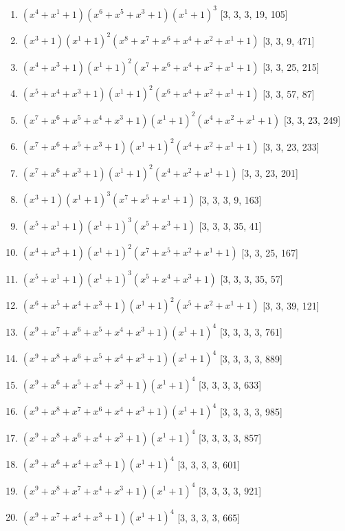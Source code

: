 \documentclass[10pt,twocolumn]{article}
\begin{document}
\begin{enumerate}
\item $(x^{4} + x^{1} + 1)(x^{6} + x^{5} + x^{3} + 1)(x^{1} + 1)^{3}$  [3, 3, 3, 19, 105]
\item $(x^{3} + 1)(x^{1} + 1)^{2}(x^{8} + x^{7} + x^{6} + x^{4} + x^{2} + x^{1} + 1)$  [3, 3, 9, 471]
\item $(x^{4} + x^{3} + 1)(x^{1} + 1)^{2}(x^{7} + x^{6} + x^{4} + x^{2} + x^{1} + 1)$  [3, 3, 25, 215]
\item $(x^{5} + x^{4} + x^{3} + 1)(x^{1} + 1)^{2}(x^{6} + x^{4} + x^{2} + x^{1} + 1)$  [3, 3, 57, 87]
\item $(x^{7} + x^{6} + x^{5} + x^{4} + x^{3} + 1)(x^{1} + 1)^{2}(x^{4} + x^{2} + x^{1} + 1)$  [3, 3, 23, 249]
\item $(x^{7} + x^{6} + x^{5} + x^{3} + 1)(x^{1} + 1)^{2}(x^{4} + x^{2} + x^{1} + 1)$  [3, 3, 23, 233]
\item $(x^{7} + x^{6} + x^{3} + 1)(x^{1} + 1)^{2}(x^{4} + x^{2} + x^{1} + 1)$  [3, 3, 23, 201]
\item $(x^{3} + 1)(x^{1} + 1)^{3}(x^{7} + x^{5} + x^{1} + 1)$  [3, 3, 3, 9, 163]
\item $(x^{5} + x^{1} + 1)(x^{1} + 1)^{3}(x^{5} + x^{3} + 1)$  [3, 3, 3, 35, 41]
\item $(x^{4} + x^{3} + 1)(x^{1} + 1)^{2}(x^{7} + x^{5} + x^{2} + x^{1} + 1)$  [3, 3, 25, 167]
\item $(x^{5} + x^{1} + 1)(x^{1} + 1)^{3}(x^{5} + x^{4} + x^{3} + 1)$  [3, 3, 3, 35, 57]
\item $(x^{6} + x^{5} + x^{4} + x^{3} + 1)(x^{1} + 1)^{2}(x^{5} + x^{2} + x^{1} + 1)$  [3, 3, 39, 121]
\item $(x^{9} + x^{7} + x^{6} + x^{5} + x^{4} + x^{3} + 1)(x^{1} + 1)^{4}$  [3, 3, 3, 3, 761]
\item $(x^{9} + x^{8} + x^{6} + x^{5} + x^{4} + x^{3} + 1)(x^{1} + 1)^{4}$  [3, 3, 3, 3, 889]
\item $(x^{9} + x^{6} + x^{5} + x^{4} + x^{3} + 1)(x^{1} + 1)^{4}$  [3, 3, 3, 3, 633]
\item $(x^{9} + x^{8} + x^{7} + x^{6} + x^{4} + x^{3} + 1)(x^{1} + 1)^{4}$  [3, 3, 3, 3, 985]
\item $(x^{9} + x^{8} + x^{6} + x^{4} + x^{3} + 1)(x^{1} + 1)^{4}$  [3, 3, 3, 3, 857]
\item $(x^{9} + x^{6} + x^{4} + x^{3} + 1)(x^{1} + 1)^{4}$  [3, 3, 3, 3, 601]
\item $(x^{9} + x^{8} + x^{7} + x^{4} + x^{3} + 1)(x^{1} + 1)^{4}$  [3, 3, 3, 3, 921]
\item $(x^{9} + x^{7} + x^{4} + x^{3} + 1)(x^{1} + 1)^{4}$  [3, 3, 3, 3, 665]

\end{enumerate}
\end{document}
